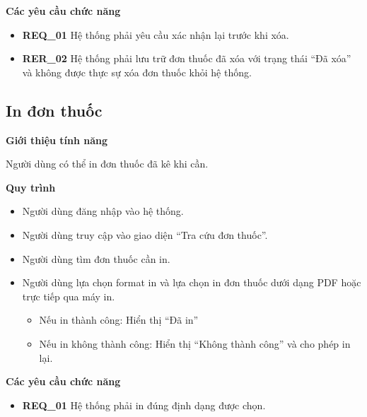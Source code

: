 \noindent \textbf{Các yêu cầu chức năng}
\begin{itemize}
    \item \textbf{REQ\_01} Hệ thống phải yêu cầu xác nhận lại trước khi xóa.
    \item \textbf{RER\_02} Hệ thống phải lưu trữ đơn thuốc đã xóa với trạng thái ``Đã xóa'' và không được thực sự xóa đơn thuốc khỏi hệ thống.
\end{itemize}

\subsection{In đơn thuốc}

\noindent \textbf{Giới thiệu tính năng}

Người dùng có thể in đơn thuốc đã kê khi cần.

\noindent \textbf{Quy trình}
\begin{itemize}
    \item Người dùng đăng nhập vào hệ thống.
    \item Người dùng truy cập vào giao diện ``Tra cứu đơn thuốc''.
    \item Người dùng tìm đơn thuốc cần in.
    \item Người dùng lựa chọn format in và lựa chọn in đơn thuốc dưới dạng PDF hoặc trực tiếp qua máy in.
    \begin{itemize}
        \item Nếu in thành công: Hiển thị ``Đã in''
        \item Nếu in không thành công: Hiển thị ``Không thành công'' và cho phép in lại.
    \end{itemize}
\end{itemize}

\noindent \textbf{Các yêu cầu chức năng}
\begin{itemize}
    \item \textbf{REQ\_01} Hệ thống phải in đúng định dạng được chọn.
\end{itemize}
